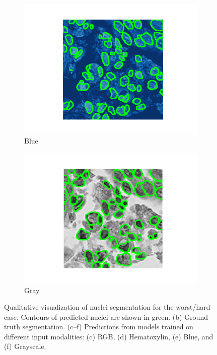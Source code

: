 \documentclass[target=bach,aauheader=,style=]{thud}
\begin{document}
\begin{figure}[!htbp]
\begin{subfigure}{0.48\textwidth}
  \centering
  \includegraphics[width=\linewidth]{imgs/qualitative/worst/Blu/contour_img.png}
  \caption{Blue}
\end{subfigure}\hfill
\begin{subfigure}{0.48\textwidth}
  \centering
  \includegraphics[width=\linewidth]{imgs/qualitative/worst/Gray/contour_img.png}
  \caption{Gray}
\end{subfigure}

\caption{Qualitative visualization of nuclei segmentation for the worst/hard case. 
Contours of predicted nuclei are shown in green. 
(b) Ground-truth segmentation. 
(c--f) Predictions from models trained on different input modalities: (c) RGB, (d) Hematoxylin, (e) Blue, and (f) Grayscale.}
\label{fig:qual_hard}
\end{figure}
\end{document}

